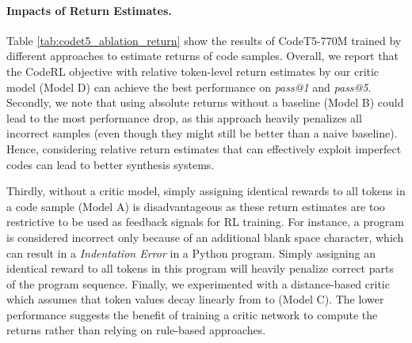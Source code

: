 \documentclass{article}
\begin{document}
\paragraph{Impacts of Return Estimates.}
Table \ref{tab:codet5_ablation_return} show the results of CodeT5-770M trained by different approaches to estimate returns of code samples.
Overall, we report that the CodeRL objective with relative token-level return estimates by our critic model (Model D) can achieve the best performance on \emph{pass@1} and \emph{pass@5}.
Secondly, we note that using absolute returns without a baseline (Model B) could lead to the most performance drop, as this approach heavily penalizes all incorrect samples (even though they might still be better than a naive baseline).
Hence, considering relative return estimates that can effectively exploit imperfect codes can lead to better synthesis systems. 

Thirdly, without a critic model, simply assigning identical rewards to all tokens in a code sample (Model A) is disadvantageous as these return estimates are too restrictive to be used as feedback signals for RL training. 
For instance, a program is considered incorrect only because of an additional blank space character, which can result in a \emph{Indentation Error} in a Python program. 
Simply assigning an identical reward to all tokens in this program will heavily penalize correct parts of the program sequence. 
Finally, we experimented with a distance-based critic which assumes that token values  decay linearly from  to  (Model C). 
The lower performance suggests the benefit of training a critic network to compute the returns rather than relying on rule-based approaches. 
\end{document}
